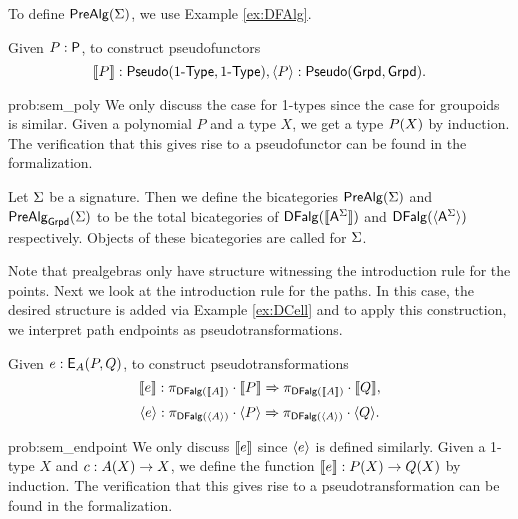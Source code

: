 To define $\prealg{\sign}$, we use Example \ref{ex:DFAlg}.

\begin{problem}
\label{prob:sem_poly}
Given $P : \poly$, to construct pseudofunctors
\[
\semP{P} : \pseudo(\onetypes, \onetypes), 
\semPG{P} : \pseudo(\grpd, \grpd).
\]
\end{problem}

\begin{construction}{prob:sem_poly}
We only discuss the case for 1-types since the case for groupoids is similar.
Given a polynomial $P$ and a type $X$, we get a type $\polyAct{P}{X}$ by induction.
The verification that this gives rise to a pseudofunctor can be found in the formalization.
\end{construction}

\begin{definition}
\label{def:prealg}
Let $\sign$ be a signature.
Then we define the bicategories $\prealg{\sign}$ and $\prealgG{\sign}$
to be the total bicategories of $\DFAlg(\semP{\pointconstr[\sign]})$
and $\DFAlg(\semPG{\pointconstr[\sign]})$ respectively.
Objects of these bicategories are called  for $\sign$.
\end{definition}

Note that prealgebras only have structure witnessing the introduction rule for the points.
Next we look at the introduction rule for the paths.
In this case, the desired structure is added via Example \ref{ex:DCell} and to apply this construction,
we interpret path endpoints as pseudotransformations.

\begin{problem}
\label{prob:sem_endpoint}
Given $e : \pathendpoint{A}{P}{Q}$, to construct pseudotransformations
\[
\semE{e} : \pstrans{\dproj{\DFAlg(\semP{A})} \cdot \semP{P}}{\dproj{\DFAlg(\semP{A})} \cdot \semP{Q}},
\]
\[
\semEG{e} : \pstrans{\dproj{\DFAlg(\semPG{A})} \cdot \semPG{P}}{\dproj{\DFAlg(\semPG{A})} \cdot \semPG{Q}}.
\]
\end{problem}

\begin{construction}{prob:sem_endpoint}
We only discuss $\semE{e}$ since $\semEG{e}$ is defined similarly.
Given a 1-type $X$ and $c : \polyAct{A}{X} \rightarrow X$, we define the function
$\semE{e} : \polyAct{P}{X} \rightarrow \polyAct{Q}{X}$ by induction.
The verification that this gives rise to a pseudotransformation can be found in the formalization.
\end{construction}

